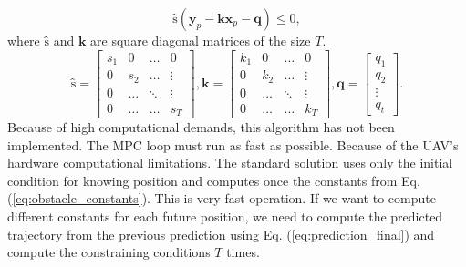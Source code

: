 \documentclass[a4paper,11pt,titlepage]{article}
\begin{document}
\begin{equation}
\label{eq:matrix_obstacle_cond}
\textbf{\^s}(\textbf{y}_p - \textbf{\^k}\textbf{x}_p - \textbf{q}) \leq 0,
\end{equation}
where $\textbf{\^s}$ and $\textbf{\^k}$ are square diagonal matrices of the size $T$.
\begin{equation}
\label{eq:obstacle_constants_matrices}
\textbf{\^s} = \begin{bmatrix}
s_1 & 0 & \hdots & 0 \\
0 & s_2 & \hdots & \vdots \\
0 & \hdots & \ddots & \vdots \\
0 & \hdots & \hdots & s_T
\end{bmatrix},
\textbf{\^k} = \begin{bmatrix}
k_1 & 0 & \hdots & 0 \\
0 & k_2 & \hdots & \vdots \\
0 & \hdots & \ddots & \vdots \\
0 & \hdots & \hdots & k_T
\end{bmatrix},
\textbf{q} = \begin{bmatrix}
q_1 \\
q_2 \\
\vdots \\
q_t
\end{bmatrix}.
\end{equation}
Because of high computational demands, this algorithm has not been implemented. The MPC loop must run as fast as possible. Because of the UAV's hardware computational limitations.  The standard solution uses only the initial condition for knowing position and computes once the constants from Eq. (\ref{eq:obstacle_constants}). This is very fast operation. If we want to compute different constants for each future position, we need to compute the predicted trajectory from the previous prediction using Eq. (\ref{eq:prediction_final}) and compute the constraining conditions $T$ times.
\end{document}
